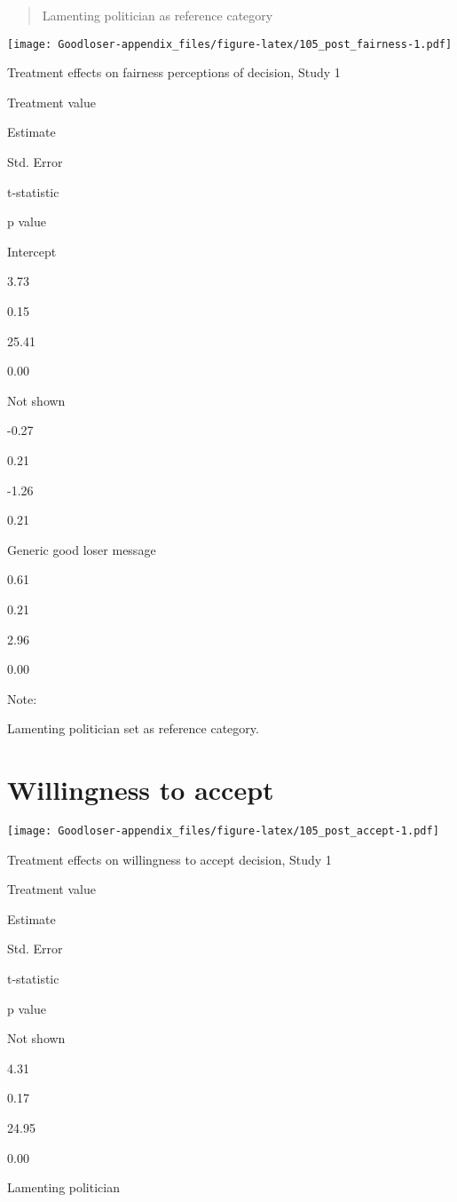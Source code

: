\documentclass[
]{book}
\begin{document}
\begin{quote}
Lamenting politician as reference category
\end{quote}

\texttt{[image: Goodloser-appendix\_files/figure-latex/105\_post\_fairness-1.pdf]}

Treatment effects on fairness perceptions of decision, Study 1

Treatment value

Estimate

Std. Error

t-statistic

p value

Intercept

3.73

0.15

25.41

0.00

Not shown

-0.27

0.21

-1.26

0.21

Generic good loser message

0.61

0.21

2.96

0.00

{Note: }

Lamenting politician set as reference category.

\hypertarget{willingness-to-accept}{%
\section{Willingness to accept}\label{willingness-to-accept}}

\texttt{[image: Goodloser-appendix\_files/figure-latex/105\_post\_accept-1.pdf]}

Treatment effects on willingness to accept decision, Study 1

Treatment value

Estimate

Std. Error

t-statistic

p value

Not shown

4.31

0.17

24.95

0.00

Lamenting politician
\end{document}
